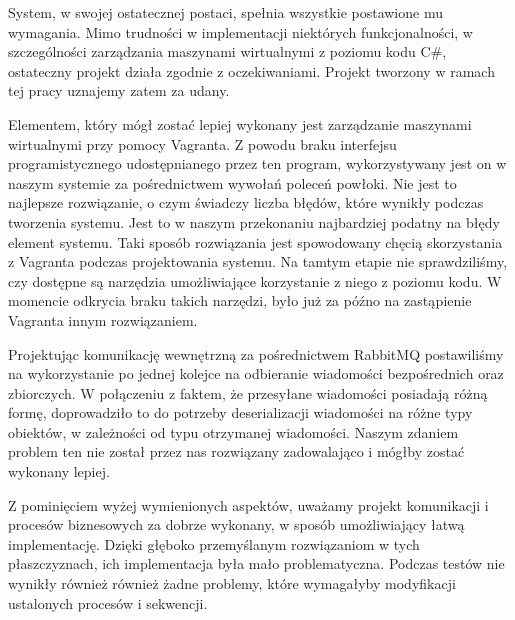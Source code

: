 \documentclass[../podsumowanie.tex]{subfiles}
\begin{document}
\label{final_system_form}

System, w swojej ostatecznej postaci, spełnia wszystkie postawione mu wymagania. Mimo trudności w implementacji niektórych funkcjonalności, w szczególności zarządzania maszynami wirtualnymi z poziomu kodu C\#, ostateczny projekt działa zgodnie z oczekiwaniami. Projekt tworzony w ramach tej pracy uznajemy zatem za udany.

Elementem, który mógł zostać lepiej wykonany jest zarządzanie maszynami wirtualnymi przy pomocy Vagranta. Z powodu braku interfejsu programistycznego udostępnianego przez ten program, wykorzystywany jest on w naszym systemie za pośrednictwem wywołań poleceń powłoki. Nie jest to najlepsze rozwiązanie, o czym świadczy liczba błędów, które wynikły podczas tworzenia systemu. Jest to w naszym przekonaniu najbardziej podatny na błędy element systemu. Taki sposób rozwiązania jest spowodowany chęcią skorzystania z Vagranta podczas projektowania systemu. Na tamtym etapie nie sprawdziliśmy, czy dostępne są narzędzia umożliwiające korzystanie z niego z poziomu kodu. W momencie odkrycia braku takich narzędzi, było już za późno na zastąpienie Vagranta innym rozwiązaniem.

Projektując komunikację wewnętrzną za pośrednictwem RabbitMQ postawiliśmy na wykorzystanie po jednej kolejce na odbieranie wiadomości bezpośrednich oraz zbiorczych. W połączeniu z faktem, że  przesyłane wiadomości posiadają różną formę, doprowadziło to do potrzeby deserializacji wiadomości na różne typy obiektów, w zależności od typu otrzymanej wiadomości. Naszym zdaniem problem ten nie został przez nas rozwiązany zadowalająco i mógłby zostać wykonany lepiej.

Z pominięciem wyżej wymienionych aspektów, uważamy projekt komunikacji i procesów biznesowych za dobrze wykonany, w sposób umożliwiający łatwą implementację. Dzięki głęboko przemyślanym rozwiązaniom w tych płaszczyznach, ich implementacja była mało problematyczna. Podczas testów nie wynikły również również żadne problemy, które wymagałyby modyfikacji ustalonych procesów i sekwencji.
\end{document}
